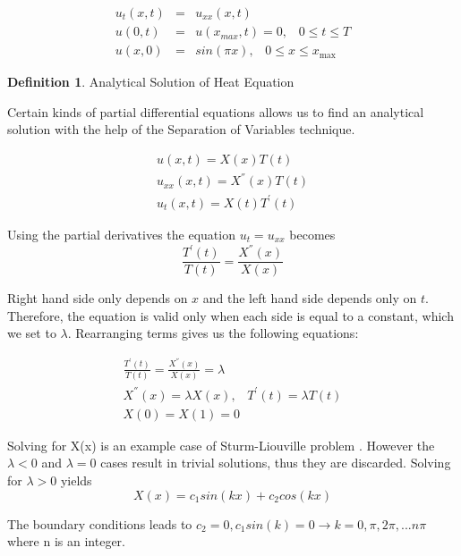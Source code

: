 \documentclass[12pt, oneside]{book}
\theoremstyle{plain}
\theoremstyle{definition}
\newtheorem{definition}[theorem]{Definition}
\begin{document}
\begin{eqnarray}
u_t(x,t) &=& u_{xx}(x, t) \\[10pt]
u(0, t) &=& u(x_{max}, t) = 0, \hspace{10pt} 0 \leq t \leq T \\[10pt]
u(x, 0) &=& sin(\pi x), \hspace{10pt} 0 \leq x \leq x_{\max}
\end{eqnarray}

\begin{definition}\label{heatAnal} Analytical Solution of Heat Equation

Certain kinds of partial differential equations allows us to find an analytical solution with the help of the Separation of Variables technique.

\begin{eqnarray}
u(x,t) = X(x) T(t) \\[10pt]
u_{xx}(x, t) = X^{''}(x) T(t) \\[10pt]
u_t (x,t) = X(t) T^{'}(t)
\end{eqnarray}

Using the partial derivatives the equation $ u_t = u_{xx} $ becomes
\begin{equation}
\frac{T^{'}(t)}{T(t)}  = \frac{X^{''}(x)}{X(x)}
\end{equation}

Right hand side only depends on $x$ and the left hand side depends only on $t$. Therefore, the equation is valid only when each side is equal to a constant, which we set to $ \lambda $. Rearranging terms gives us the following equations:

\begin{eqnarray}
\frac{T^{'}(t)}{T(t)}  = \frac{X^{''}(x)}{X(x)} = \lambda \\[10pt]
X^{''}(x) = \lambda X(x), \hspace{10pt} T^{'}(t) = \lambda T(t) \\[10pt]
X(0) = X(1) = 0
\end{eqnarray}

Solving for X(x) is an example case of Sturm-Liouville problem \cite{sepvar}. However the $\lambda < 0$ and $\lambda = 0$ cases result in trivial solutions, thus they are discarded. Solving for $\lambda > 0$ yields
\begin{equation}
X(x)= c_1 sin(kx) + c_2 cos(kx)
\end{equation}

The boundary conditions leads to $ c_2 = 0, c_1 sin(k) = 0 \rightarrow k = 0, \pi, 2\pi, ...n\pi$ where n is an integer.


\end{definition}
\end{document}
